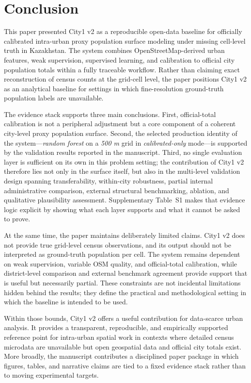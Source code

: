 \section{Conclusion}

This paper presented City1 v2 as a reproducible open-data baseline for officially calibrated intra-urban proxy population surface modeling under missing cell-level truth in Kazakhstan. The system combines OpenStreetMap-derived urban features, weak supervision, supervised learning, and calibration to official city population totals within a fully traceable workflow. Rather than claiming exact reconstruction of census counts at the grid-cell level, the paper positions City1 v2 as an analytical baseline for settings in which fine-resolution ground-truth population labels are unavailable.

The evidence stack supports three main conclusions. First, official-total calibration is not a peripheral adjustment but a core component of a coherent city-level proxy population surface. Second, the selected production identity of the system---\emph{random forest} on a \emph{500 m} grid in \emph{calibrated-only} mode---is supported by the validation results reported in the manuscript. Third, no single evaluation layer is sufficient on its own in this problem setting; the contribution of City1 v2 therefore lies not only in the surface itself, but also in the multi-level validation design spanning transferability, within-city robustness, partial internal administrative comparison, external structural benchmarking, ablation, and qualitative plausibility assessment. Supplementary Table~S1 makes that evidence logic explicit by showing what each layer supports and what it cannot be asked to prove.

At the same time, the paper maintains deliberately limited claims. City1 v2 does not provide true grid-level census observations, and its output should not be interpreted as ground-truth population per cell. The system remains dependent on weak supervision, variable OSM quality, and official-total calibration, while district-level comparison and external benchmark agreement provide support that is useful but necessarily partial. These constraints are not incidental limitations hidden behind the results; they define the practical and methodological setting in which the baseline is intended to be used.

Within those bounds, City1 v2 offers a useful contribution for data-scarce urban analysis. It provides a transparent, reproducible, and empirically supported reference point for intra-urban spatial work in contexts where detailed census microdata are unavailable but open geospatial data and official city totals exist. More broadly, the manuscript contributes a disciplined paper package in which figures, tables, and narrative claims are tied to a fixed evidence stack rather than to moving experimental targets.

